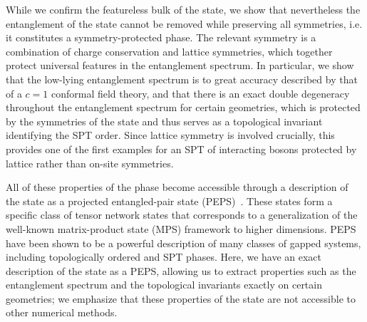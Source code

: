 While we confirm the featureless bulk of the state, we show that nevertheless the entanglement of the state cannot be removed while preserving
all symmetries, i.e. it constitutes a symmetry-protected phase. The relevant symmetry is a combination of charge
conservation and lattice symmetries, which together protect universal features in the entanglement spectrum. In
particular, we show that the low-lying entanglement spectrum is to great accuracy described by that of a $c=1$
conformal field theory, and that there is an exact double 
degeneracy throughout the entanglement spectrum for certain geometries, which is protected
by the symmetries of the state and thus serves as a topological invariant identifying the SPT order.
Since lattice symmetry is involved crucially, this provides one of the first examples for an SPT of interacting bosons
protected by lattice rather than on-site symmetries.


All of these properties of the phase become accessible through a description of the state
as a projected entangled-pair state (PEPS)~\cite{verstraete2004}. These states form a specific class of tensor
network states that corresponds to a generalization of the well-known matrix-product state (MPS)
framework to higher dimensions. PEPS have been shown to be a powerful description of many
classes of gapped systems, including topologically ordered and SPT phases. Here, we have an
exact description of the state as a PEPS, allowing us to extract properties such as the entanglement
spectrum and the topological invariants exactly on certain geometries; we emphasize that these
properties of the state are not accessible to other numerical methods.

